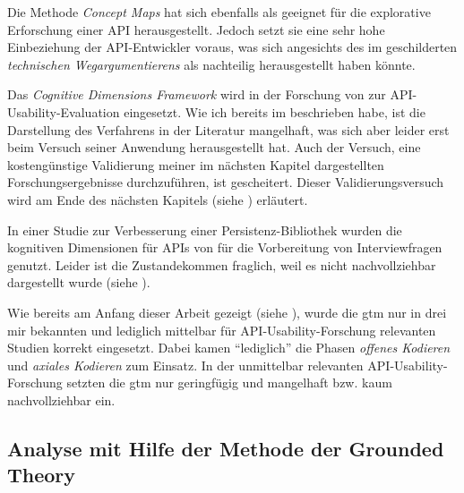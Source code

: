 Die Methode \textit{Concept Maps} \citep[siehe  und][]{Tenny:2011jp} hat sich ebenfalls als geeignet für die explorative Erforschung einer API herausgestellt. Jedoch setzt sie eine sehr hohe Einbeziehung der API-Entwickler voraus, was sich angesichts des im  geschilderten \textit{technischen Wegargumentierens} \citep{Sarodnick:2006vc} als nachteilig herausgestellt haben könnte.

Das \textit{Cognitive Dimensions Framework} wird in der Forschung von \cite{clarke:2006} zur API-Usability-Evaluation eingesetzt. Wie ich bereits im  beschrieben habe, ist die Darstellung des Verfahrens in der Literatur mangelhaft, was sich aber leider erst beim Versuch seiner Anwendung herausgestellt hat. Auch der Versuch, eine kostengünstige Validierung meiner im nächsten Kapitel dargestellten Forschungsergebnisse durchzuführen, ist gescheitert. Dieser Validierungsversuch wird am Ende des nächsten Kapitels (siehe ) erläutert.

In einer Studie zur Verbesserung einer Persistenz-Bibliothek \citep[siehe  und][]{Piccioni:2013uq} wurden die kognitiven Dimensionen für APIs von \cite{Anonymous:9HSMlhmF} für die Vorbereitung von Interviewfragen genutzt. Leider ist die Zustandekommen fraglich, weil es nicht nachvollziehbar dargestellt wurde (siehe ).

Wie bereits am Anfang dieser Arbeit gezeigt (siehe ), wurde die \gls{gtm} nur in drei mir bekannten und lediglich mittelbar für API-Usability-Forschung relevanten Studien \citep{Simula.simula.1294,Yamashita:2013hn,Yamashita:2013un} korrekt eingesetzt. Dabei kamen ``lediglich'' die Phasen \textit{offenes Kodieren} und \textit{axiales Kodieren} zum Einsatz. In der unmittelbar relevanten API-Usability-Forschung setzten \cite{Tenny:2011jp,deSouza:2004fd,sunshine2014searching} die \gls{gtm} nur geringfügig und mangelhaft bzw. kaum nachvollziehbar ein.


\subsection{Analyse mit Hilfe der Methode der Grounded Theory}
\label{sec:gtm-application}

